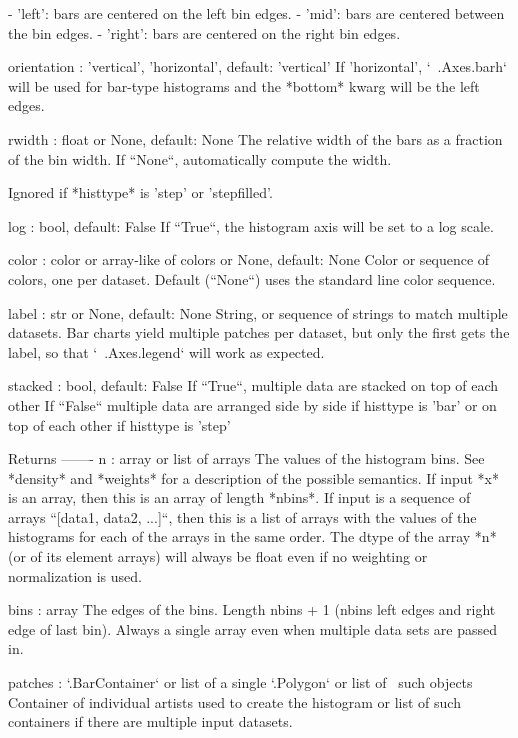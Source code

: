 \begin{DoxyVerb}
\begin{DoxyVerb}
    - 'left': bars are centered on the left bin edges.
    - 'mid': bars are centered between the bin edges.
    - 'right': bars are centered on the right bin edges.

orientation : {'vertical', 'horizontal'}, default: 'vertical'
    If 'horizontal', `~.Axes.barh` will be used for bar-type histograms
    and the *bottom* kwarg will be the left edges.

rwidth : float or None, default: None
    The relative width of the bars as a fraction of the bin width.  If
    ``None``, automatically compute the width.

    Ignored if *histtype* is 'step' or 'stepfilled'.

log : bool, default: False
    If ``True``, the histogram axis will be set to a log scale.

color : color or array-like of colors or None, default: None
    Color or sequence of colors, one per dataset.  Default (``None``)
    uses the standard line color sequence.

label : str or None, default: None
    String, or sequence of strings to match multiple datasets.  Bar
    charts yield multiple patches per dataset, but only the first gets
    the label, so that `~.Axes.legend` will work as expected.

stacked : bool, default: False
    If ``True``, multiple data are stacked on top of each other If
    ``False`` multiple data are arranged side by side if histtype is
    'bar' or on top of each other if histtype is 'step'

Returns
-------
n : array or list of arrays
    The values of the histogram bins. See *density* and *weights* for a
    description of the possible semantics.  If input *x* is an array,
    then this is an array of length *nbins*. If input is a sequence of
    arrays ``[data1, data2, ...]``, then this is a list of arrays with
    the values of the histograms for each of the arrays in the same
    order.  The dtype of the array *n* (or of its element arrays) will
    always be float even if no weighting or normalization is used.

bins : array
    The edges of the bins. Length nbins + 1 (nbins left edges and right
    edge of last bin).  Always a single array even when multiple data
    sets are passed in.

patches : `.BarContainer` or list of a single `.Polygon` or list of \
such objects
    Container of individual artists used to create the histogram
    or list of such containers if there are multiple input datasets.


\end{DoxyVerb}
\end{DoxyVerb}
